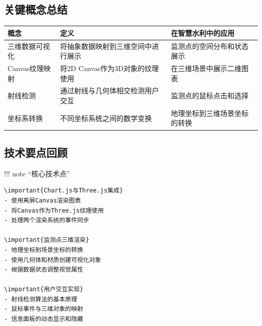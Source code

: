 \hypertarget{ux5173ux952eux6982ux5ff5ux603bux7ed3}{%
\subsection{关键概念总结}\label{ux5173ux952eux6982ux5ff5ux603bux7ed3}}

\begin{longtable}[]{@{}lll@{}}
\toprule\noalign{}
概念 & 定义 & 在智慧水利中的应用 \\
\midrule\noalign{}
\endhead
\bottomrule\noalign{}
\endlastfoot
三维数据可视化 & 将抽象数据映射到三维空间中进行展示 & 监测点的空间分布和状态展示 \\
Canvas纹理映射 & 将2D Canvas作为3D对象的纹理使用 & 在三维场景中展示二维图表 \\
射线检测 & 通过射线与几何体相交检测用户交互 & 监测点的鼠标点击和选择 \\
坐标系转换 & 不同坐标系统之间的数学变换 & 地理坐标到三维场景坐标的转换 \\
\end{longtable}

\hypertarget{ux6280ux672fux8981ux70b9ux56deux987e}{%
\subsection{技术要点回顾}\label{ux6280ux672fux8981ux70b9ux56deux987e}}

!!! note ``核心技术点''

\begin{verbatim}
\important{Chart.js与Three.js集成}
- 使用离屏Canvas渲染图表
- 将Canvas作为Three.js纹理使用
- 处理两个渲染系统的事件同步

\important{监测点三维渲染}
- 地理坐标到场景坐标的转换
- 使用几何体和材质创建可视化对象
- 根据数据状态调整视觉属性

\important{用户交互实现}
- 射线检测算法的基本原理
- 鼠标事件与三维对象的映射
- 信息面板的动态显示和隐藏
\end{verbatim}


